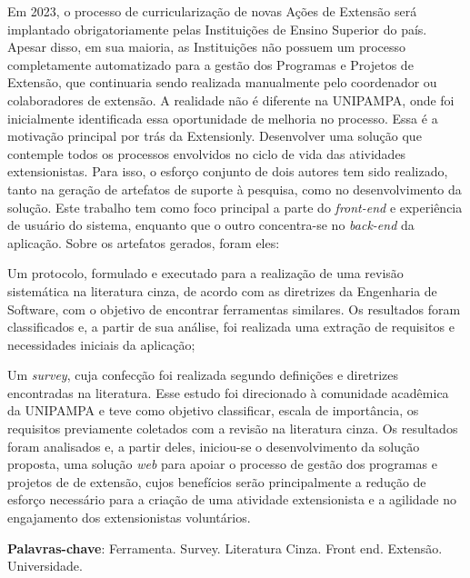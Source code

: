 \begin{resumo}
  Em 2023, o processo de curricularização de novas Ações de Extensão será implantado obrigatoriamente pelas Instituições de Ensino Superior do país. Apesar disso, em sua maioria, as Instituições não possuem um processo completamente automatizado para a gestão dos Programas e Projetos de Extensão, que continuaria sendo realizada manualmente pelo coordenador ou colaboradores de extensão. A realidade não é diferente na \acs{UNIPAMPA}, onde foi inicialmente identificada essa oportunidade de melhoria no processo. Essa é a motivação principal por trás da Extensionly. Desenvolver uma solução que contemple todos os processos envolvidos no ciclo de vida das atividades extensionistas. Para isso, o esforço conjunto de dois autores tem sido realizado, tanto na geração de artefatos de suporte à pesquisa, como no desenvolvimento da solução. Este trabalho tem como foco principal a parte do \textit{front-end} e experiência de usuário do sistema, enquanto que o outro concentra-se no \textit{back-end} da aplicação. Sobre os artefatos gerados, foram eles:
  \begin{inparaenum}[(a)]
    \item Um protocolo, formulado e executado para a realização de uma revisão sistemática na literatura cinza, de acordo com as diretrizes da Engenharia de Software, com o objetivo de encontrar ferramentas similares. Os resultados foram classificados e, a partir de sua análise, foi realizada uma extração de requisitos e necessidades iniciais da aplicação;
    \item Um \textit{survey}, cuja confecção foi realizada segundo definições e diretrizes encontradas na literatura. Esse estudo foi direcionado à comunidade acadêmica da \ac{UNIPAMPA} e teve como objetivo classificar, escala de importância, os requisitos previamente coletados com a revisão na literatura cinza. Os resultados foram analisados e, a partir deles, iniciou-se o desenvolvimento da solução proposta, uma solução \textit{web} para apoiar o processo de gestão dos programas e projetos de de extensão, cujos benefícios serão principalmente a redução de esforço necessário para a criação de uma atividade extensionista e a agilidade no engajamento dos extensionistas voluntários.
  \end{inparaenum}

  \vspace{\onelineskip}

  \noindent
  \textbf{Palavras-chave}: Ferramenta. Survey. Literatura Cinza. Front end. Extensão. Universidade.
\end{resumo}
